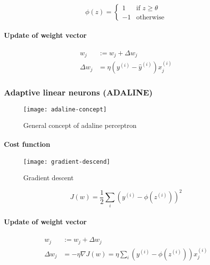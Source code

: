 \documentclass{article}
\begin{document}
			\begin{equation}
				\phi(z) = \begin{cases}
					1 &\mbox{if } z \geq \theta \\
					-1 &\mbox{otherwise}
				\end{cases}
			\end{equation}

			\paragraph{Update of weight vector}

			\begin{align}
					w_j &:= w_j + \Delta w_j \\
					\Delta w_j &= \eta(y^{(i)} - \hat{y}^{(i)}) x^{(i)}_j
			\end{align}

			\subsubsection{Adaptive linear neurons (ADALINE)}

			\begin{figure}
				\centering
				\texttt{[image: adaline-concept]}
				\caption{General concept of adaline perceptron}
				\label{fig:adaline-concept}
			\end{figure}

			\paragraph{Cost function}

			\begin{figure}
				\centering
				\texttt{[image: gradient-descend]}
				\caption{Gradient descent}
				\label{fig:gradient-descend}
			\end{figure}

			\begin{equation}
				J(w) = \frac{1}{2} \sum_i (y^{(i)}-\phi(z^{(i)}))^2
			\end{equation}

			\paragraph{Update of weight vector}

			\begin{align}
					w_j &:= w_j + \Delta w_j \\
					\Delta w_j &= -\eta\nabla J(w) = \eta\sum_i (y^{(i)} -\phi(z^{(i)}))x^{(i)}_j
			\end{align}
\end{document}
